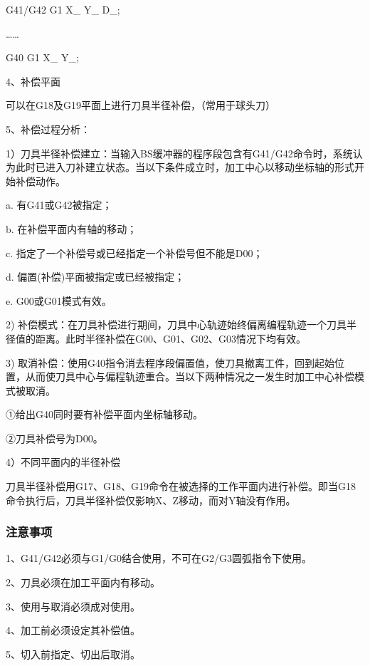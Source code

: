 G41/G42 G1 X\_ Y\_  D\_;

……

G40 G1 X\_ Y\_;

4、补偿平面

可以在G18及G19平面上进行刀具半径补偿，（常用于球头刀）

5、补偿过程分析：

1）刀具半径补偿建立：当输入BS缓冲器的程序段包含有G41/G42命令时，系统认为此时已进入刀补建立状态。当以下条件成立时，加工中心以移动坐标轴的形式开始补偿动作。 

a. 有G41或G42被指定； 

b. 在补偿平面内有轴的移动； 

c. 指定了一个补偿号或已经指定一个补偿号但不能是D00；
 
d. 偏置(补偿)平面被指定或已经被指定； 

e. G00或G01模式有效。 

2) 补偿模式：在刀具补偿进行期间，刀具中心轨迹始终偏离编程轨迹一个刀具半径值的距离。此时半径补偿在G00、G01、G02、G03情况下均有效。 

3) 取消补偿：使用G40指令消去程序段偏置值，使刀具撤离工件，回到起始位置，从而使刀具中心与偏程轨迹重合。当以下两种情况之一发生时加工中心补偿模式被取消。

①给出G40同时要有补偿平面内坐标轴移动。

②刀具补偿号为D00。

4）不同平面内的半径补偿 

刀具半径补偿用G17、G18、G19命令在被选择的工作平面内进行补偿。即当G18命令执行后，刀具半径补偿仅影响X、Z移动，而对Y轴没有作用。


\subsubsection{注意事项}
1、G41/G42必须与G1/G0结合使用，不可在G2/G3圆弧指令下使用。

2、刀具必须在加工平面内有移动。

3、使用与取消必须成对使用。

4、加工前必须设定其补偿值。

5、切入前指定、切出后取消。


